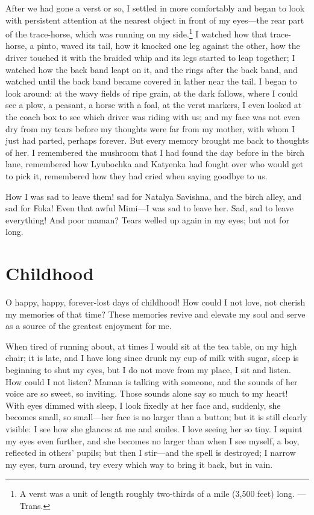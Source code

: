 After we had gone a verst or so, I settled in more comfortably and began to look with persistent attention at the nearest object in front of my eyes---the rear part of the trace-horse, which was running on my side.\footnote{A verst was a unit of length roughly two-thirds of a mile (3,500 feet) long. ---Trans.} I watched how that trace-horse, a pinto, waved its tail, how it knocked one leg against the other, how the driver touched it with the braided whip and its legs started to leap together; I watched how the back band leapt on it, and the rings after the back band, and watched until the back band became covered in lather near the tail. I began to look around: at the wavy fields of ripe grain, at the dark fallows, where I could see a plow, a peasant, a horse with a foal, at the verst markers, I even looked at the coach box to see which driver was riding with us; and my face was not even dry from my tears before my thoughts were far from my mother, with whom I just had parted, perhaps forever. But every memory brought me back to thoughts of her. I remembered the mushroom that I had found the day before in the birch lane, remembered how Lyubochka and Katyenka had fought over who would get to pick it, remembered how they had cried when saying goodbye to us.

How I was sad to leave them! sad for Natalya Savishna, and the birch alley, and sad for Foka! Even that awful Mimi---I was sad to leave her. Sad, sad to leave everything! And poor maman? Tears welled up again in my eyes; but not for long.

\chapter{Childhood} %

O happy, happy, forever-lost days of childhood! How could I not love, not cherish my memories of that time? These memories revive and elevate my soul and serve as a source of the greatest enjoyment for me.

When tired of running about, at times I would sit at the tea table, on my high chair; it is late, and I have long since drunk my cup of milk with sugar, sleep is beginning to shut my eyes, but I do not move from my place, I sit and listen. How could I not listen? Maman is talking with someone, and the sounds of her voice are so sweet, so inviting. Those sounds alone say so much to my heart! With eyes dimmed with sleep, I look fixedly at her face and, suddenly, she becomes small, so small---her face is no larger than a button; but it is still clearly visible: I see how she glances at me and smiles. I love seeing her so tiny. I squint my eyes even further, and she becomes no larger than when I see myself, a boy, reflected in others' pupils; but then I stir---and the spell is destroyed; I narrow my eyes, turn around, try every which way to bring it back, but in vain.

